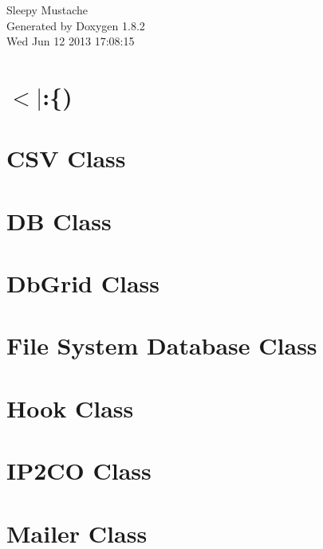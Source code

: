 \documentclass{book}
\begin{document}
\hypersetup{pageanchor=false,citecolor=blue}
\begin{titlepage}
\vspace*{7cm}
\begin{center}
{\Large Sleepy Mustache }\\
\vspace*{1cm}
{\large Generated by Doxygen 1.8.2}\\
\vspace*{0.5cm}
{\small Wed Jun 12 2013 17:08:15}\\
\end{center}
\end{titlepage}
\clearemptydoublepage
{}
\tableofcontents
\clearemptydoublepage
{}
\hypersetup{pageanchor=true,citecolor=blue}
\chapter{$<$$|$\-:\{)}
\label{index}\hypertarget{index}{}
\chapter{C\-S\-V Class}
\label{csv1}
\hypertarget{csv1}{}

\chapter{D\-B Class}
\label{db1}
\hypertarget{db1}{}

\chapter{Db\-Grid Class}
\label{dbgrid1}
\hypertarget{dbgrid1}{}

\chapter{File System Database Class}
\label{fsdb}
\hypertarget{fsdb}{}

\chapter{Hook Class}
\label{hooks1}
\hypertarget{hooks1}{}

\chapter{I\-P2\-C\-O Class}
\label{ip2country}
\hypertarget{ip2country}{}

\chapter{Mailer Class}
\label{mailer1}
\hypertarget{mailer1}{}

\end{document}
